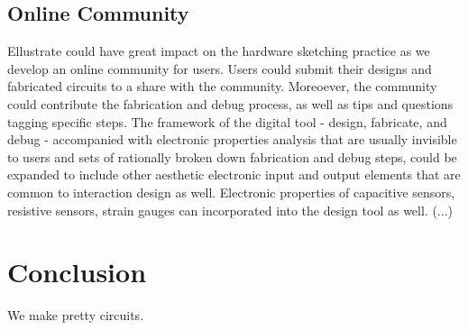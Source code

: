 \documentclass{sigchi}
\begin{document}
\subsection{Online Community}
Ellustrate could have great impact on the hardware sketching practice as we develop an online community for users. Users could submit their designs and fabricated circuits to a share with the community. Moreoever, the community could contribute the fabrication and debug process, as well as tips and questions tagging specific steps. The framework of the digital tool - design, fabricate, and debug - accompanied with electronic properties analysis that are usually invisible to users and sets of rationally broken down fabrication and debug steps, could be expanded to include other aesthetic electronic input and output elements that are common to interaction design as well. Electronic properties of capacitive sensors, resistive sensors, strain gauges can incorporated into the design tool as well. (...)

\section {Conclusion}
We make pretty circuits.


\balance



\end{document}
